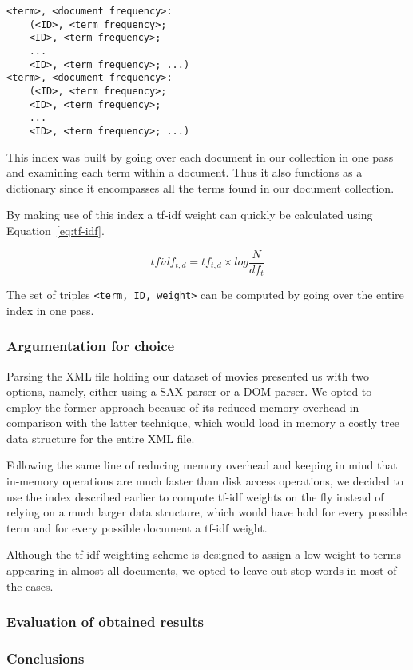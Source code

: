 \begin{lstlisting}[caption={The structure of the tf-idf index},label={lst:tf-idf-index}]
<term>, <document frequency>:
	(<ID>, <term frequency>;
	<ID>, <term frequency>;
	...
	<ID>, <term frequency>; ...)
<term>, <document frequency>:
	(<ID>, <term frequency>;
	<ID>, <term frequency>;
	...
	<ID>, <term frequency>; ...)
\end{lstlisting}

This index was built by going over each document in our collection in one pass and examining each term within a document. Thus it also functions as a dictionary since it encompasses all the terms found in our document collection. 

By making use of this index a tf-idf weight can quickly be calculated using Equation~\ref{eq:tf-idf}.

\begin{equation}
\label{eq:tf-idf}
tfidf_{t,d} = tf_{t,d} \times log\frac{N}{df_t}
\end{equation}

The set of triples \verb+<term, ID, weight>+ can be computed by going over the entire index in one pass.

\subsubsection{Argumentation for choice}

Parsing the XML file holding our dataset of movies presented us with two options, namely, either using a SAX parser or a DOM parser. We opted to employ the former approach because of its reduced memory overhead in comparison with the latter technique, which would load in memory a costly tree data structure for the entire XML file.

Following the same line of reducing memory overhead and keeping in mind that in-memory operations are much faster than disk access operations, we decided to use the index described earlier to compute tf-idf weights on the fly instead of relying on a much larger data structure, which would have hold for every possible term and for every possible document a tf-idf weight.

Although the tf-idf weighting scheme is designed to assign a low weight to terms appearing in almost all documents, we opted to leave out stop words in most of the cases.

\subsubsection{Evaluation of obtained results}

\subsubsection{Conclusions}

